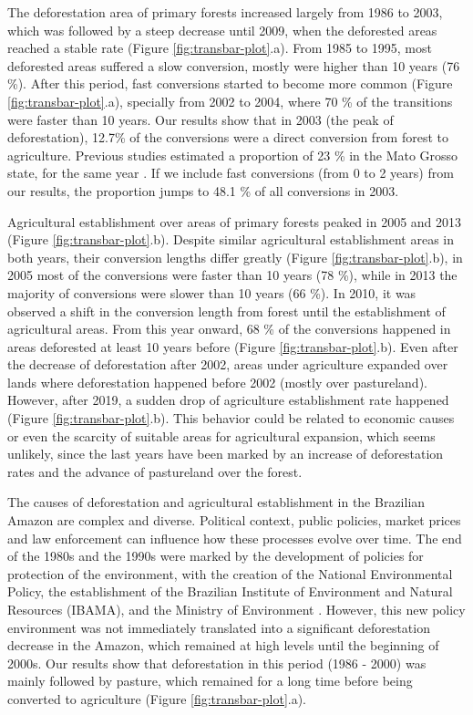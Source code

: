 \documentclass[essd, manuscript]{copernicus}
\begin{document}
The deforestation area of primary forests increased largely from 1986 to 2003, which was followed by a steep decrease until 2009, when the deforested areas reached a stable rate (Figure \ref{fig:transbar-plot}.a).
From 1985 to 1995, most deforested areas suffered a slow conversion, mostly were higher than 10 years (76 \%).
After this period, fast conversions started to become more common (Figure \ref{fig:transbar-plot}.a), specially from 2002 to 2004, where 70 \% of the transitions were faster than 10 years.
Our results show that in 2003 (the peak of deforestation), 12.7\% of the conversions were a direct conversion from forest to agriculture.
Previous studies estimated a proportion of 23 \% in the Mato Grosso state, for the same year \citep{Morton2006}.
If we include fast conversions (from 0 to 2 years) from our results, the proportion jumps to 48.1 \% of all conversions in 2003.

Agricultural establishment over areas of primary forests peaked in 2005 and 2013 (Figure \ref{fig:transbar-plot}.b).
Despite similar agricultural establishment areas in both years, their conversion lengths differ greatly (Figure \ref{fig:transbar-plot}.b), in 2005 most of the conversions were faster than 10 years (78 \%), while in 2013 the majority of conversions were slower than 10 years (66 \%).
In 2010, it was observed a shift in the conversion length from forest until the establishment of agricultural areas.
From this year onward, 68 \% of the conversions happened in areas deforested at least 10 years before (Figure \ref{fig:transbar-plot}.b).
Even after the decrease of deforestation after 2002, areas under agriculture expanded over lands where deforestation happened before 2002 (mostly over pastureland).
However, after 2019, a sudden drop of agriculture establishment rate happened (Figure \ref{fig:transbar-plot}.b).
This behavior could be related to economic causes or even the scarcity of suitable areas for agricultural expansion, which seems unlikely, since the last years have been marked by an increase of deforestation rates and the advance of pastureland over the forest.

The causes of deforestation and agricultural establishment in the Brazilian Amazon are complex and diverse.
Political context, public policies, market prices and law enforcement can influence how these processes evolve over time.
The end of the 1980s and the 1990s were marked by the development of policies for protection of the environment, with the creation of the National Environmental Policy, the establishment of the Brazilian Institute of Environment and Natural Resources (IBAMA), and the Ministry of Environment \citep{Banerjee2009}.
However, this new policy environment was not immediately translated into a significant deforestation decrease in the Amazon, which remained at high levels until the beginning of 2000s.
Our results show that deforestation in this period (1986 - 2000) was mainly followed by pasture, which remained for a long time before being converted to agriculture (Figure \ref{fig:transbar-plot}.a).
\end{document}
